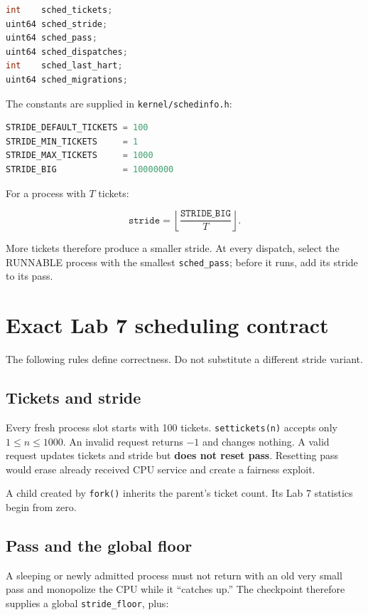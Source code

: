 \documentclass[11pt,a4paper]{article}
\newcommand{\file}[1]{\texttt{#1}}
\begin{document}
\begin{lstlisting}[language=C]
int    sched_tickets;
uint64 sched_stride;
uint64 sched_pass;
uint64 sched_dispatches;
int    sched_last_hart;
uint64 sched_migrations;
\end{lstlisting}

The constants are supplied in \file{kernel/schedinfo.h}:

\begin{lstlisting}[language=C]
STRIDE_DEFAULT_TICKETS = 100
STRIDE_MIN_TICKETS     = 1
STRIDE_MAX_TICKETS     = 1000
STRIDE_BIG             = 10000000
\end{lstlisting}

For a process with $T$ tickets:

\[
\texttt{stride}=\left\lfloor\frac{\texttt{STRIDE\_BIG}}{T}\right\rfloor.
\]

More tickets therefore produce a smaller stride. At every dispatch, select the RUNNABLE process with the smallest \file{sched\_pass}; before it runs, add its stride to its pass.

\section{Exact Lab 7 scheduling contract}

The following rules define correctness. Do not substitute a different stride variant.

\subsection{Tickets and stride}

Every fresh process slot starts with 100 tickets. \file{settickets(n)} accepts only $1\le n\le1000$. An invalid request returns $-1$ and changes nothing. A valid request updates tickets and stride but \textbf{does not reset pass}. Resetting pass would erase already received CPU service and create a fairness exploit.

A child created by \file{fork()} inherits the parent's ticket count. Its Lab 7 statistics begin from zero.

\subsection{Pass and the global floor}

A sleeping or newly admitted process must not return with an old very small pass and monopolize the CPU while it ``catches up.'' The checkpoint therefore supplies a global \file{stride\_floor}, plus:
\end{document}
